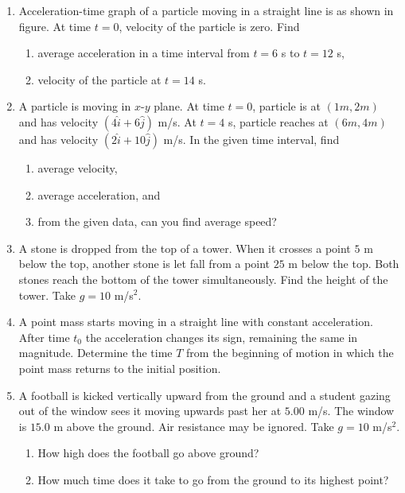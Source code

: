 \documentclass{article}
\begin{document}
\begin{enumerate}
\item Acceleration-time graph of a particle moving in a straight line is as shown in figure. At time \( t = 0 \), velocity of the particle is zero. Find
\begin{enumerate}
    \item average acceleration in a time interval from \( t = 6 \) s to \( t = 12 \) s,
    \item velocity of the particle at \( t = 14 \) s.
\end{enumerate}

\begin{center}
\end{center}

\item A particle is moving in \( x \)-\( y \) plane. At time \( t = 0 \), particle is at \( (1m, 2m) \) and has velocity \( (4 \hat{i} + 6 \hat{j}) \) m/s. At \( t = 4 \) s, particle reaches at \( (6m, 4m) \) and has velocity \( (2 \hat{i} + 10 \hat{j}) \) m/s. In the given time interval, find
\begin{enumerate}
    \item average velocity,
    \item average acceleration, and
    \item from the given data, can you find average speed?
\end{enumerate}

\item A stone is dropped from the top of a tower. When it crosses a point \( 5 \) m below the top, another stone is let fall from a point \( 25 \) m below the top. Both stones reach the bottom of the tower simultaneously. Find the height of the tower. Take \( g = 10 \) m/s\(^2\).

\item A point mass starts moving in a straight line with constant acceleration. After time \( t_0 \) the acceleration changes its sign, remaining the same in magnitude. Determine the time \( T \) from the beginning of motion in which the point mass returns to the initial position.

\item A football is kicked vertically upward from the ground and a student gazing out of the window sees it moving upwards past her at \( 5.00 \) m/s. The window is \( 15.0 \) m above the ground. Air resistance may be ignored. Take \( g = 10 \) m/s\(^2\).
\begin{enumerate}
    \item How high does the football go above ground?
    \item How much time does it take to go from the ground to its highest point?
\end{enumerate}


\end{enumerate}
\end{document}
